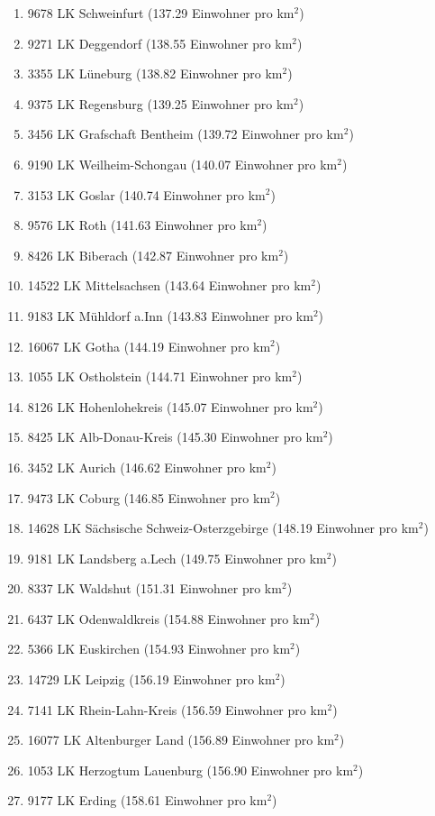 \begin{enumerate}[itemsep=-6mm]
\item 9678 LK Schweinfurt (137.29 Einwohner pro km$^2$)
\item 9271 LK Deggendorf (138.55 Einwohner pro km$^2$)
\item 3355 LK Lüneburg (138.82 Einwohner pro km$^2$)
\item 9375 LK Regensburg (139.25 Einwohner pro km$^2$)
\item 3456 LK Grafschaft Bentheim (139.72 Einwohner pro km$^2$)
\item 9190 LK Weilheim-Schongau (140.07 Einwohner pro km$^2$)
\item 3153 LK Goslar (140.74 Einwohner pro km$^2$)
\item 9576 LK Roth (141.63 Einwohner pro km$^2$)
\item 8426 LK Biberach (142.87 Einwohner pro km$^2$)
\item 14522 LK Mittelsachsen (143.64 Einwohner pro km$^2$)
\item 9183 LK Mühldorf a.Inn (143.83 Einwohner pro km$^2$)
\item 16067 LK Gotha (144.19 Einwohner pro km$^2$)
\item 1055 LK Ostholstein (144.71 Einwohner pro km$^2$)
\item 8126 LK Hohenlohekreis (145.07 Einwohner pro km$^2$)
\item 8425 LK Alb-Donau-Kreis (145.30 Einwohner pro km$^2$)
\item 3452 LK Aurich (146.62 Einwohner pro km$^2$)
\item 9473 LK Coburg (146.85 Einwohner pro km$^2$)
\item 14628 LK Sächsische Schweiz-Osterzgebirge (148.19 Einwohner pro km$^2$)
\item 9181 LK Landsberg a.Lech (149.75 Einwohner pro km$^2$)
\item 8337 LK Waldshut (151.31 Einwohner pro km$^2$)
\item 6437 LK Odenwaldkreis (154.88 Einwohner pro km$^2$)
\item 5366 LK Euskirchen (154.93 Einwohner pro km$^2$)
\item 14729 LK Leipzig (156.19 Einwohner pro km$^2$)
\item 7141 LK Rhein-Lahn-Kreis (156.59 Einwohner pro km$^2$)
\item 16077 LK Altenburger Land (156.89 Einwohner pro km$^2$)
\item 1053 LK Herzogtum Lauenburg (156.90 Einwohner pro km$^2$)
\item 9177 LK Erding (158.61 Einwohner pro km$^2$)

\end{enumerate}
